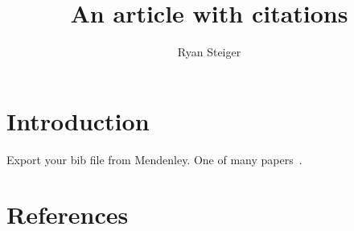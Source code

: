 \documentclass{article}
\title{An article with citations}
\author{Ryan Steiger}
\date{}
\begin{document}
\maketitle

\section{Introduction}

Export your bib file from Mendenley. One of many papers~\cite{Poddebniak2018}.

\section{References}



\end{document}
